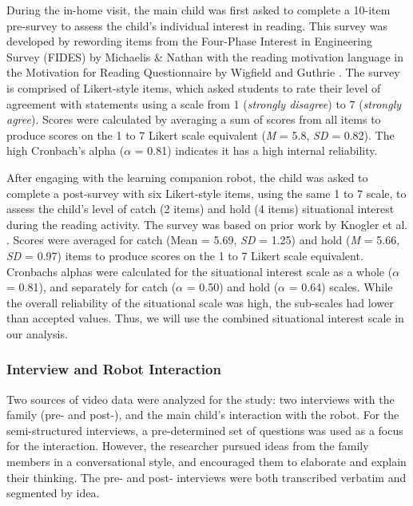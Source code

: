 \documentclass{sigchi}
\begin{document}
  During the in-home visit, the main child was first asked to complete a 10-item pre-survey to assess the child's individual interest in reading. This survey was developed by rewording items from the Four-Phase Interest in Engineering Survey (FIDES) by Michaelis \& Nathan \cite{Michaelis:2015} with the reading motivation language in the Motivation for Reading Questionnaire by Wigfield and Guthrie \cite{Wigfield:1997}. The survey is comprised of Likert-style items, which asked students to rate their level of agreement with statements using a scale from 1 (\textit{strongly disagree}) to 7 (\textit{strongly agree}). Scores were calculated by averaging a sum of scores from all items to produce scores on the 1 to 7 Likert scale equivalent (\textit{M} = 5.8, \textit{SD} = 0.82). The high Cronbach's alpha ($\alpha$ = 0.81) indicates it has a high internal reliability.
 
  After engaging with the learning companion robot, the child was asked to complete a post-survey with six Likert-style items, using the same 1 to 7 scale, to assess the child's level of catch (2 items) and hold (4 items) situational interest during the reading activity. The survey was based on prior work by Knogler et al. \cite{Knogler:2015}. Scores were averaged for catch (Mean = 5.69, \textit{SD} = 1.25) and hold (\textit{M} = 5.66, \textit{SD} = 0.97) items to produce scores on the 1 to 7 Likert scale equivalent. Cronbachs alphas were calculated for the situational interest scale as a whole ($\alpha$ = 0.81), and separately for catch ($\alpha$ = 0.50) and hold ($\alpha$ = 0.64) scales. While the overall reliability of the situational scale was high, the sub-scales had lower than accepted values. Thus, we will use the combined situational interest scale in our analysis.
  
\subsubsection{Interview and Robot Interaction}
  Two sources of video data were analyzed for the study: two interviews with the family (pre- and post-), and the main child's interaction with the robot. For the semi-structured interviews, a pre-determined set of questions was used as a focus for the interaction. However, the researcher pursued ideas from the family members in a conversational style, and encouraged them to elaborate and explain their thinking. The pre- and post- interviews were both transcribed verbatim and segmented by idea\cite{Chi:1997}.
 
\end{document}
